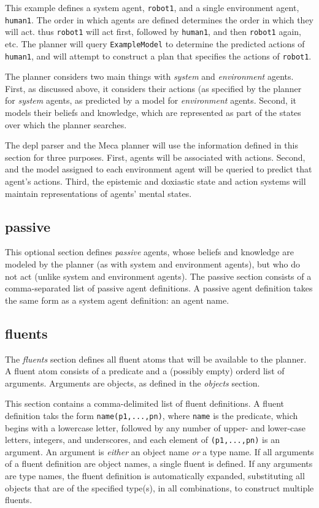 \documentclass{article}
\begin{document}
{This example defines a system agent, \texttt{robot1}, and a single environment
agent, \texttt{human1}.
The order in which agents are defined determines the order in which they will
act. thus \texttt{robot1} will act first, followed by
\texttt{human1}, and then \texttt{robot1} again, etc. The planner will query
\texttt{ExampleModel} to determine the predicted actions of \texttt{human1}, and
will attempt to construct a plan that specifies the actions of \texttt{robot1}.

The planner considers two main things with \emph{system} and \emph{environment}
agents. First, as discussed above, it considers their actions (as specified by
the planner for \emph{system} agents, as predicted by a model for
\emph{environment} agents. Second, it models their beliefs and knowledge, which
are represented as part of the states over which the planner searches.

The depl parser and the Meca planner will use the information defined in this
section for three
purposes. First, agents will be associated with actions. Second, and the model
assigned to each environment agent will be queried to predict that agent's
actions. Third, the epistemic and doxiastic state and action
systems will maintain representations of agents' mental states.



\subsection{passive}

This optional section defines \emph{passive} agents, whose beliefs and knowledge are
modeled by the planner (as with system and environment agents), but
who do not act (unlike system and environment agents).
The passive section consists of a comma-separated list of passive agent
definitions. A passive agent definition takes the same form as a system
agent definition: an agent name.



\subsection{fluents}

The \emph{fluents} section defines all fluent atoms that will be available to the planner. A
fluent atom consists of a predicate and a (possibly empty) orderd list of
arguments. Arguments are objects, as defined in the \emph{objects} section.

This section contains a comma-delimited list of fluent definitions. A fluent
definition taks the form \verb|name(p1,...,pn)|, where \verb|name| is the
predicate, which begins with a lowercase letter, followed by any number of
upper- and lower-case letters, integers, and underscores, and each element of
\verb|(p1,...,pn)| is an argument. An argument is
\emph{either} an object name \emph{or} a type name. If all arguments
of a fluent definition are object names, a single fluent is defined. If any
arguments are type names, the fluent definition is automatically expanded,
substituting all objects that are of the specified type(s), in all combinations, to
construct multiple fluents.



}
\end{document}
